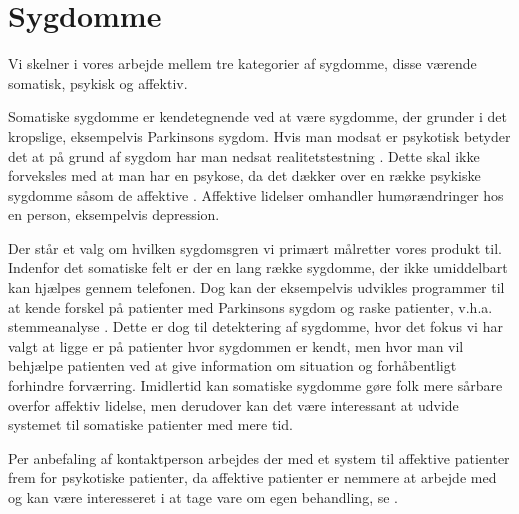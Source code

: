 \section{Sygdomme}
Vi skelner i vores arbejde mellem tre kategorier af sygdomme, disse værende somatisk, psykisk og affektiv.

Somatiske sygdomme er kendetegnende ved at være sygdomme, der grunder i det kropslige, eksempelvis Parkinsons sygdom.
Hvis man modsat er psykotisk betyder det at på grund af sygdom har man nedsat realitetstestning \citep{misc:netpsykpsykose}.
Dette skal ikke forveksles med at man har en psykose, da det dækker over en række psykiske sygdomme såsom de affektive \citep{misc:netpsykpsykose}.
Affektive lidelser omhandler humørændringer hos en person, eksempelvis depression.

Der står et valg om hvilken sygdomsgren vi primært målretter vores produkt til.
Indenfor det somatiske felt er der en lang række sygdomme, der ikke umiddelbart kan hjælpes gennem telefonen.
Dog kan der eksempelvis udvikles programmer til at kende forskel på patienter med Parkinsons sygdom og raske patienter, v.h.a. stemmeanalyse \citep{6168572}.
Dette er dog til detektering af sygdomme, hvor det fokus vi har valgt at ligge er på patienter hvor sygdommen er kendt, men hvor man vil behjælpe patienten ved at give information om situation og forhåbentligt forhindre forværring.
Imidlertid kan somatiske sygdomme gøre folk mere sårbare overfor affektiv lidelse, men derudover kan det være interessant at udvide systemet til somatiske patienter med mere tid.

Per anbefaling af kontaktperson \citet{misc:janne-rasmussen} arbejdes der med et system til affektive patienter frem for psykotiske patienter, da affektive patienter er nemmere at arbejde med og kan være interesseret i at tage vare om egen behandling, se .